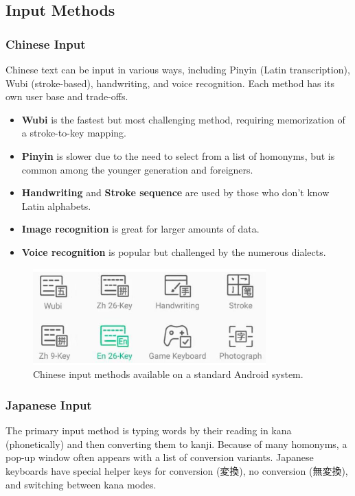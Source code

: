 \documentclass[11pt]{article}
\begin{document}
\subsection{Input Methods}
\subsubsection{Chinese Input}
Chinese text can be input in various ways, including Pinyin (Latin transcription), Wubi (stroke-based), handwriting, and voice recognition. Each method has its own user base and trade-offs.
\begin{itemize}
    \item \textbf{Wubi} is the fastest but most challenging method, requiring memorization of a stroke-to-key mapping.
    \item \textbf{Pinyin} is slower due to the need to select from a list of homonyms, but is common among the younger generation and foreigners.
    \item \textbf{Handwriting} and \textbf{Stroke sequence} are used by those who don't know Latin alphabets.
    \item \textbf{Image recognition} is great for larger amounts of data.
    \item \textbf{Voice recognition} is popular but challenged by the numerous dialects.
\end{itemize}

\begin{figure}[h!]
    \centering
    \includegraphics[width=0.8\textwidth]{Screen-Shot-2019-08-19-at-7.54.54-AM.png}
    \caption{Chinese input methods available on a standard Android system.}
    \label{fig:chinese_input_methods}
\end{figure}

\subsubsection{Japanese Input}
The primary input method is typing words by their reading in kana (phonetically) and then converting them to kanji. Because of many homonyms, a pop-up window often appears with a list of conversion variants. Japanese keyboards have special helper keys for conversion (変換), no conversion (無変換), and switching between kana modes.
\end{document}
